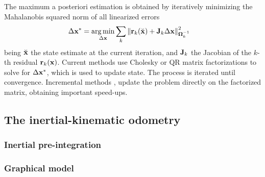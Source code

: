 The maximum a posteriori estimation is obtained by iteratively minimizing the Mahalanobis squared norm of all linearized errors
%
\begin{align}
  \Delta {\bf x}^* &= \operatorname*{arg\,min}_{\Delta {\bf x}} \sum_k {\left\| {\bf r}_k(\breve{{\bf x}}) + {\bf J}_k \Delta {\bf x} \right\|}_{{\bm \Omega}_k^{-1}}^2 \label{eq:LeastSquares}
\end{align}
%
being $\breve{{\bf x}}$ the state estimate at the current iteration, and ${\bf J}_k$ the Jacobian of the $k$-th residual ${\bf r}_k({\bf x})$.
%
Current methods use Cholesky \cite{Kummerle_icra11,ila_ijrr17} or QR  \cite{Dellaert_ijrr06,Kaess_ijrr11} matrix factorizations to solve for $\Delta{\bf x}^*$, which is used to update state. 
The process is iterated until convergence.
%
Incremental methods \cite{Kaess_ijrr11,ila_ijrr17}, update the problem directly on the factorized matrix, obtaining important speed-ups.




\subsection{The inertial-kinematic odometry}
\subsubsection{Inertial pre-integration}
\subsubsection{Graphical model}

